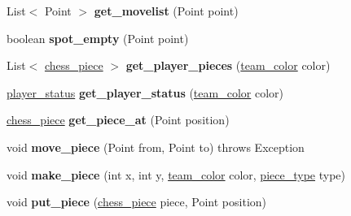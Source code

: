 \begin{DoxyCompactItemize}
\item 
\hypertarget{classchess__core_1_1chess__game_ae06f22607a25c2eb8506028bf36cd029}{}List$<$ Point $>$ {\bfseries get\+\_\+movelist} (Point point)\label{classchess__core_1_1chess__game_ae06f22607a25c2eb8506028bf36cd029}

\item 
\hypertarget{classchess__core_1_1chess__game_a148c8578eb1f84b6f14a73587ac6b232}{}boolean {\bfseries spot\+\_\+empty} (Point point)\label{classchess__core_1_1chess__game_a148c8578eb1f84b6f14a73587ac6b232}

\item 
\hypertarget{classchess__core_1_1chess__game_a5fddc69fb2cb29aa8ffd071c40289a11}{}List$<$ \hyperlink{classchess__core_1_1chess__piece}{chess\+\_\+piece} $>$ {\bfseries get\+\_\+player\+\_\+pieces} (\hyperlink{enumchess__core_1_1team__color}{team\+\_\+color} color)\label{classchess__core_1_1chess__game_a5fddc69fb2cb29aa8ffd071c40289a11}

\item 
\hypertarget{classchess__core_1_1chess__game_ab3a5f5c195645e86285d69895e51fd5d}{}\hyperlink{enumchess__core_1_1player__status}{player\+\_\+status} {\bfseries get\+\_\+player\+\_\+status} (\hyperlink{enumchess__core_1_1team__color}{team\+\_\+color} color)\label{classchess__core_1_1chess__game_ab3a5f5c195645e86285d69895e51fd5d}

\item 
\hypertarget{classchess__core_1_1chess__game_a9c144a5e9c141119dc8c3820b8d05d13}{}\hyperlink{classchess__core_1_1chess__piece}{chess\+\_\+piece} {\bfseries get\+\_\+piece\+\_\+at} (Point position)\label{classchess__core_1_1chess__game_a9c144a5e9c141119dc8c3820b8d05d13}

\item 
\hypertarget{classchess__core_1_1chess__game_a4efa1ef50e67b669c56cd482b8378f78}{}void {\bfseries move\+\_\+piece} (Point from, Point to)  throws Exception\label{classchess__core_1_1chess__game_a4efa1ef50e67b669c56cd482b8378f78}

\item 
\hypertarget{classchess__core_1_1chess__game_a57b8ea6545cf8dabeb00e05305a11520}{}void {\bfseries make\+\_\+piece} (int x, int y, \hyperlink{enumchess__core_1_1team__color}{team\+\_\+color} color, \hyperlink{enumchess__core_1_1piece__type}{piece\+\_\+type} type)\label{classchess__core_1_1chess__game_a57b8ea6545cf8dabeb00e05305a11520}

\item 
\hypertarget{classchess__core_1_1chess__game_af267d2fc681a90ea7afdaf49f7034c9f}{}void {\bfseries put\+\_\+piece} (\hyperlink{classchess__core_1_1chess__piece}{chess\+\_\+piece} piece, Point position)\label{classchess__core_1_1chess__game_af267d2fc681a90ea7afdaf49f7034c9f}


\end{DoxyCompactItemize}
